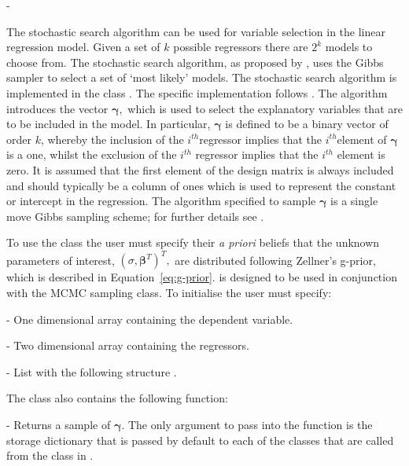 -\documentclass[article]{jss}
\begin{document}
The stochastic search algorithm can be used for variable selection in
the linear regression model. Given a set of $k$ possible regressors
there are $2^{k}$ models to choose from. The stochastic search
algorithm, as proposed by \citet{GeorgeMcCulloch1993}, uses the Gibbs
sampler to select a set of `most likely' models. The stochastic search
algorithm is implemented in the class . The
specific implementation follows \citet{MarinRobert2007}. The algorithm
introduces the vector $\bm{\gamma},$ which is used to select the
explanatory variables that are to be included in the model. In
particular, $\bm{\gamma}$ is defined to be a binary vector of order
$k$, whereby the inclusion of the $i^{th}$regressor implies that the
$i^{th}$element of $\bm{\gamma}$ is a one, whilst the exclusion of the
$i^{th}$ regressor implies that the $i^{th}$ element is zero.  It is
assumed that the first element of the design matrix is always included
and should typically be a column of ones which is used to represent
the constant or intercept in the regression. The algorithm specified
to sample $\bm{\gamma}$ is a single move Gibbs sampling scheme; for
further details see \citet{MarinRobert2007}.

To use the class the user must specify their
\emph{a priori} beliefs that the unknown parameters of interest,
$(\sigma,\bm{\beta}^{T})^{T},$ are distributed following Zellner's
g-prior, which is described in Equation~\ref{eq:g-prior}.
is designed to be used in conjunction with the
MCMC sampling class. To initialise  the user
must specify:
\begin{description}
\item {} - One dimensional  array containing the
  dependent variable.
\item {} - Two dimensional  array containing the
  regressors.
\item {} - List with the following structure
  \code{{[}betaubar, g{]}}.
\end{description}
The class  also contains the following
function:
\begin{description}
\item {} - Returns a sample of $\bm{\gamma}.$
  The only argument to pass into the function  is
  the storage dictionary that is passed by default to each of the
  classes that are called from the class in .
\end{description}
\end{document}
